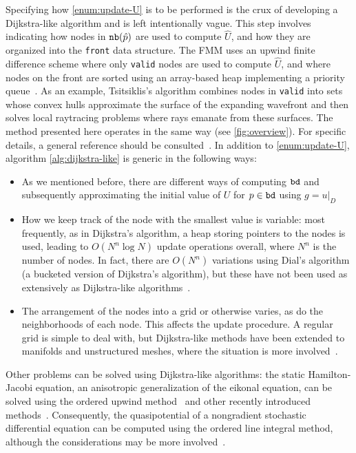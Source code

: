 \documentclass{article}
\begin{document}
Specifying how \cref{enum:update-U} is to be performed is the crux of
developing a Dijkstra-like algorithm and is left intentionally
vague. This step involves indicating how nodes in $\texttt{nb}(\hat{p})$ are
used to compute $\hat{U}$, and how they are organized into the
\texttt{front} data structure. The FMM uses an upwind finite
difference scheme where only \texttt{valid} nodes are used to compute
$\hat{U}$, and where nodes on the front are sorted using an
array-based heap implementing a priority
queue~\cite{sethian1996fast}. As an example, Tsitsiklis's algorithm
combines nodes in \texttt{valid} into sets whose convex hulls
approximate the surface of the expanding wavefront and then solves
local raytracing problems where rays emanate from these surfaces. The
method presented here operates in the same way (see
\cref{fig:overview}). For specific details, a general reference should
be consulted~\cite{sethian1999level}. In addition to
\cref{enum:update-U}, algorithm \cref{alg:dijkstra-like} is generic in
the following ways:
\begin{itemize}
\item As we mentioned before, there are different ways of computing
  $\texttt{bd}$ and subsequently approximating the initial value of $U$
  for $p \in \texttt{bd}$ using
  $g = \left. u \right|_D$~\cite{chopp2001some}
\item How we keep track of the node with the smallest value is
  variable: most frequently, as in Dijkstra's algorithm, a heap
  storing pointers to the nodes is used, leading to $O(N^n \log N)$
  update operations overall, where $N^n$ is the number of nodes. In
  fact, there are $O(N^n)$ variations using Dial's algorithm (a
  bucketed version of Dijkstra's algorithm), but these have not been
  used as extensively as Dijkstra-like
  algorithms~\cite{tsitsiklis1995efficient,kim2001calo,yatziv2006n}.
\item The arrangement of the nodes into a grid or otherwise varies, as
  do the neighborhoods of each node. This affects the update
  procedure. A regular grid is simple to deal with, but Dijkstra-like
  methods have been extended to manifolds and unstructured meshes,
  where the situation is more
  involved~\cite{kimmel1998computing,sethian2000fast,bronstein2008numerical}.
\end{itemize}
Other problems can be solved using Dijkstra-like algorithms: the
static Hamilton-Jacobi equation, an anisotropic generalization of the
eikonal equation, can be solved using the ordered upwind
method~\cite{sethian2003ordered} and other recently introduced
methods~\cite{mirebeau2014efficient,mirebeau2014anisotropic}. Consequently,
the quasipotential of a nongradient stochastic differential equation
can be computed using the ordered line integral method, although the
considerations may be more
involved~\cite{dahiya2017ordered,dahiya2018ordered,yang2019computing}.
\end{document}
